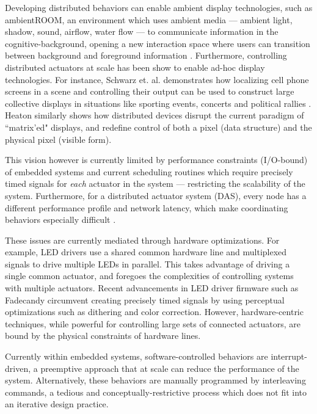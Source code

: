 \documentclass{sigchi}
\begin{document}
Developing distributed behaviors can enable ambient display technologies, such as ambientROOM, an environment which uses ambient media –-- ambient light, shadow, sound, airflow, water flow --- to communicate information in the cognitive-background, opening a new interaction space where users can transition between background and foreground information \cite{ishii_tangible_1997}. Furthermore, controlling distributed actuators at scale has been show to enable ad-hoc display technologies. For instance, Schwarz et. al. demonstrates how localizing cell phone screens in a scene and controlling their output can be used to construct large collective displays in situations like sporting events, concerts and political rallies \cite{schwarz_phone_2012}. Heaton similarly shows how distributed devices disrupt the current paradigm of ``matrix'ed" displays, and redefine control of both a pixel (data structure) and the physical pixel (visible form)\cite{heaton_physical_2000}.

This vision however is currently limited by performance constraints (I/O-bound) of embedded systems and current scheduling routines which require precisely timed signals for \textit{each} actuator in the system --- restricting the scalability of the system. Furthermore, for a distributed actuator system (DAS), every node has a different performance profile and network latency, which make coordinating behaviors especially difficult \cite{ballagas_patch_2004}. 


These issues are currently mediated through hardware optimizations. For example, LED drivers use a shared common hardware line and multiplexed signals to drive multiple LEDs in parallel. This takes advantage of driving a single common actuator, and foregoes the complexities of controlling systems with multiple actuators. Recent advancements in LED driver firmware such as Fadecandy \cite{scott_fadecandy_2013} circumvent creating precisely timed signals by using perceptual optimizations such as dithering and color correction. However, hardware-centric techniques, while powerful for controlling large sets of connected actuators, are bound by the physical constraints of hardware lines. 

Currently within embedded systems, software-controlled behaviors are interrupt-driven, a preemptive approach that at scale can reduce the performance of the system. Alternatively, these behaviors are manually programmed by interleaving commands, a tedious and conceptually-restrictive process which does not fit into an iterative design practice. 
 
\end{document}
